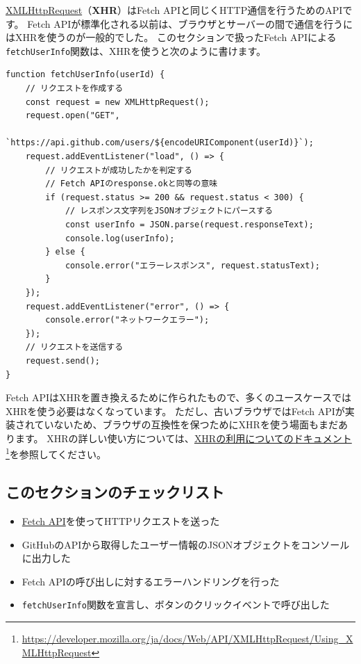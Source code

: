 \begin{tcolorbox}[title=XMLHttpRequest]\label{xhr}

\href{https://developer.mozilla.org/ja/docs/Web/API/XMLHttpRequest}{XMLHttpRequest}（\textbf{XHR}）はFetch
APIと同じくHTTP通信を行うためのAPIです。 Fetch
APIが標準化される以前は、ブラウザとサーバーの間で通信を行うにはXHRを使うのが一般的でした。
このセクションで扱ったFetch
APIによる\texttt{fetchUserInfo}関数は、XHRを使うと次のように書けます。

\begin{lstlisting}
function fetchUserInfo(userId) {
    // リクエストを作成する
    const request = new XMLHttpRequest();
    request.open("GET", 
            `https://api.github.com/users/${encodeURIComponent(userId)}`);
    request.addEventListener("load", () => {
        // リクエストが成功したかを判定する
        // Fetch APIのresponse.okと同等の意味
        if (request.status >= 200 && request.status < 300) {
            // レスポンス文字列をJSONオブジェクトにパースする
            const userInfo = JSON.parse(request.responseText);
            console.log(userInfo);
        } else {
            console.error("エラーレスポンス", request.statusText);
        }
    });
    request.addEventListener("error", () => {
        console.error("ネットワークエラー");
    });
    // リクエストを送信する
    request.send();
}
\end{lstlisting}

Fetch
APIはXHRを置き換えるために作られたもので、多くのユースケースではXHRを使う必要はなくなっています。
ただし、古いブラウザではFetch
APIが実装されていないため、ブラウザの互換性を保つためにXHRを使う場面もまだあります。
XHRの詳しい使い方については、\href{https://developer.mozilla.org/ja/docs/Web/API/XMLHttpRequest/Using_XMLHttpRequest}{XHRの利用についてのドキュメント}\footnote{\url{https://developer.mozilla.org/ja/docs/Web/API/XMLHttpRequest/Using_XMLHttpRequest}}を参照してください。
\end{tcolorbox}

\hypertarget{section-checklist}{%
\subsection{このセクションのチェックリスト}\label{section-checklist}}

\begin{itemize}
\item
  \href{https://developer.mozilla.org/ja/docs/Web/API/Fetch_API}{Fetch
  API}を使ってHTTPリクエストを送った
\item
  GitHubのAPIから取得したユーザー情報のJSONオブジェクトをコンソールに出力した
\item
  Fetch APIの呼び出しに対するエラーハンドリングを行った
\item
  \texttt{fetchUserInfo}関数を宣言し、ボタンのクリックイベントで呼び出した
\end{itemize}

